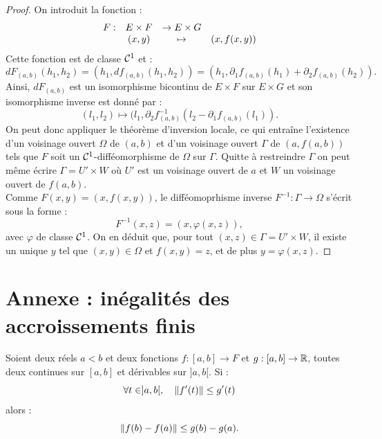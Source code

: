 \begin{proof}
On introduit la fonction :
\[ \begin{array}{c c c c}
F : & E \times F & \to E \times G \\
& (x,y) & \mapsto & (x, f(x,y))
\end{array} \]
Cette fonction est de classe $\mathcal{C}^1$ et :
\[ dF_{(a,b)}(h_1,h_2) = (h_1, df_{(a,b)}(h_1, h_2)) = (h_1, \partial_1 f_{(a,b)}(h_1) + \partial_2 f_{(a,b)}(h_2)) . \]
Ainsi, $dF_{(a,b)}$ est un isomorphisme bicontinu de $ E \times F$ sur $E \times G$ et son isomorphisme inverse est donné par :
\[ (l_1, l_2) \mapsto (l_1, \partial_2 f_{(a,b)}^{-1}(l_2 - \partial_1 f_{(a,b)}(l_1)) . \]
On peut donc appliquer le théorème d'inversion locale, ce qui entraîne l'existence d'un voisinage ouvert $\Omega$ de $(a,b)$
et d'un voisinage ouvert $\Gamma$ de $(a,f(a,b))$ tels que $F$ soit un $\mathcal{C}^1$-difféomorphisme de $\Omega$ sur $\Gamma$.
Quitte à restreindre $\Gamma$  on peut même écrire $\Gamma = U' \times W$ où $U'$ est un voisinage ouvert de $a$ et $W$ un 
voisinage ouvert de $f(a,b)$. \\
Comme $F(x,y)=(x, f(x,y))$, le difféomoprhisme inverse $F^{-1} : \Gamma \to \Omega$ s'écrit sous la forme :
\[ F^{-1}(x,z) = (x, \varphi(x,z)) , \]
avec $\varphi$ de classe $\mathcal{C}^1$. On en déduit que, pour tout $(x,z) \in \Gamma = U' \times W$, il existe un unique $y$ tel que
$(x,y) \in \Omega$ et $f(x,y)=z$, et de plus $y=\varphi(x,z)$. 
\end{proof}

\newpage

\section*{Annexe : inégalités des accroissements finis}

\begin{thm}[cas $\R \to F$]
Soient deux réels $a < b$ et deux fonctions $f : [a,b] \to F$ et $g : [a,b] \to \mathbb{R}$, toutes deux continues sur $[a,b]$ et dérivables sur
$]a,b[$. Si :
\[ \forall t \in ]a,b[, \quad \lVert f'(t)\rVert \leq g'(t) \]
alors :
\[ \lVert f(b)-f(a)\rVert\leq g(b) - g(a) . \]
\end{thm}


